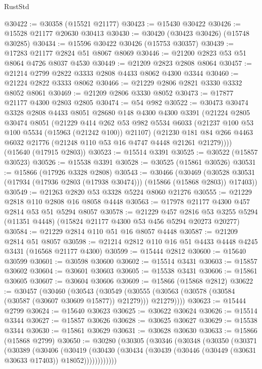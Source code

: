 \begin{lexlean}{RustStd}
\begin{coremodule}
@30422 := @30358 (@15521 @21177)
@30423 := @15430 @30422
@30426 := @15528 @21177 @20630 @30413
@30430 := @30420 (@30423 @30426) (@15748 @30285)
@30434 := @15596 @30422 @30426 (@15753 @30357)
@30439 := @17283 @21177 @2824 @51 @8067 @8069
@30446 := @21200 @2823 @53 @51 @8064 @4726 @8037 @4530
@30449 := @21209 @2823 @2808 @8064
@30457 := @21214 @2799 @2822 @3333 @2808 @4433 @8062 @4300 @3344
@30460 := @21224 @2822 @3333 @8062
@30466 := @21229 @2806 @2821 @3330 @3332 @8052 @8061
@30469 := @21209 @2806 @3330 @8052
@30473 := @17877 @21177 @4300 @2803 @2805
@30474 := @54 @982
@30522 := @30473
    @30474
    @3328
    @2808
    @4433
    @8051
    @28680
    @148
    @4300
    @4300
    @3391
    (@21224
      @2805
      @30474
      @8051
      (@21229
        @414
        @262
        @53
        @982
        @5534
        @6033
        (@21237 @100 @53 @100 @5534 (@15963 (@21242 @100)) @21107)
        (@21230 @181 @84 @266 @4463 @6032 @21776 (@21248 @110 @53 @16 @4747 @4448 @21261 @21279))))
    (@15640 (@17915 @2803))
@30523 := @15514 @3391
@30525 := @30522 (@15857 @30523)
@30526 := @15538 @3391
@30528 := @30525 (@15861 @30526)
@30531 := @15866 (@17926 @3328 @2808)
@30543 := @30466
    (@30469 (@30528 @30531 (@17934 (@17936 @2803 (@17938 @30474))) (@15866 (@15868 @2803)) @17403))
@30549 := @21263 @2820 @53 @3328 @5224 @8060 @21276
@30555 := @21229 @2818 @110 @2808 @16 @8058 @4448
@30563 := @17978 @21177 @4300 @457 @2814 @53 @51 @5294 @8057
@30578 := @21229
    @457
    @2816
    @53
    @3255
    @5294
    (@11351 @4448)
    (@15824 @21177 @4300 @53 @456 @5294 @20273 @20277)
@30584 := @21229 @2814 @110 @51 @16 @8057 @4448
@30587 := @21209 @2814 @51 @8057
@30598 := @21214 @2812 @110 @16 @51 @4433 @4448 @4245 @3431 (@16568 @21177 @4300)
@30599 := @15444 @2812
@30600 := @15640 @30599
@30601 := @30598 @30600
@30602 := @15514 @3431
@30603 := @15857 @30602
@30604 := @30601 @30603
@30605 := @15538 @3431
@30606 := @15861 @30605
@30607 := @30604 @30606
@30609 := @15866 (@15868 @2812)
@30622 := @30457
    (@30460
      (@30543
        (@30549 (@30555 (@30563 (@30578 (@30584 (@30587 (@30607 @30609 @15877)) @21279))) @21279))))
@30623 := @15444 @2799
@30624 := @15640 @30623
@30625 := @30622 @30624
@30626 := @15514 @3344
@30627 := @15857 @30626
@30628 := @30625 @30627
@30629 := @15538 @3344
@30630 := @15861 @30629
@30631 := @30628 @30630
@30633 := @15866 (@15868 @2799)
@30650 := @30280
    (@30305
      (@30346
        (@30348
          (@30350
            (@30371
              (@30389
                (@30406
                  (@30419
                    (@30430
                      (@30434 (@30439 (@30446 (@30449 (@30631 @30633 @17403)) @18052))))))))))))

\end{coremodule}
\end{lexlean}

